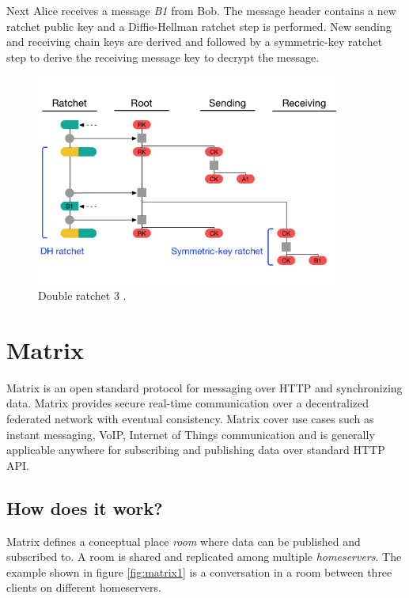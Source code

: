 Next Alice receives a message \emph{B1} from Bob. The message header contains a new ratchet public key and a Diffie-Hellman ratchet step is performed. New sending and receiving chain keys are derived and followed by a symmetric-key ratchet step to derive the receiving message key to decrypt the message.

\begin{figure}[H]
	\centering
	\includegraphics[width=10cm]{figures/doubleratchet3.png}
	\caption{Double ratchet 3 \cite{doubleratchet}.}
	\label{fig:doubleratchet3}
\end{figure}


\newpage
\section{Matrix}

Matrix is an open standard protocol for messaging over HTTP and synchronizing data. Matrix provides secure real-time communication over a decentralized federated network with eventual consistency. Matrix cover use cases such as instant messaging, VoIP, Internet of Things communication and is generally applicable anywhere for subscribing and publishing data over standard HTTP API.




\subsection{How does it work?}

Matrix defines a conceptual place \emph{room} where data can be published and subscribed to. A room is shared and replicated among multiple \emph{homeservers}. The example shown in figure \ref{fig:matrix1} is a conversation in a room between three clients on different homeservers. 


